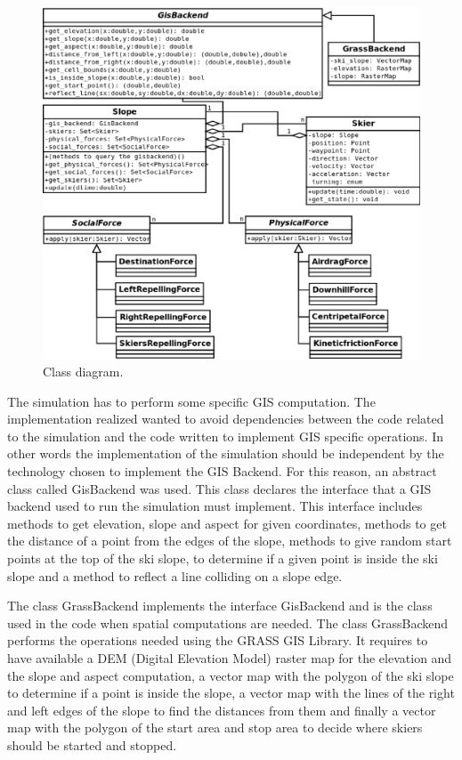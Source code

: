 \documentclass[12pt,a4paper,twoside]{book}
\begin{document}
\begin{figure}
  \begin{center}
    \includegraphics[width=\textwidth]{images/Class_diagram.eps}
    \caption{Class diagram.}\label{class_diagram}
  \end{center}
\end{figure}

The simulation has to perform some specific GIS computation. The implementation realized wanted to avoid dependencies between the code related to the simulation and the code written to implement GIS specific operations. In other words the implementation of the simulation should be independent by the technology chosen to implement the GIS Backend. For this reason, an abstract class called GisBackend was used. This class declares the interface that a GIS backend used to run the simulation must implement. This interface includes methods to get elevation, slope and aspect for given coordinates, methods to get the distance of a point from the edges of the slope, methods to give random start points at the top of the ski slope, to determine if a given point is inside the ski slope and a method to reflect a line colliding on a slope edge.

The class GrassBackend implements the interface GisBackend and is the class used in the code when spatial computations are needed. The class GrassBackend performs the operations needed using the GRASS GIS Library. It requires to have available a DEM (Digital Elevation Model) raster map for the elevation and the slope and aspect computation, a vector map with the polygon of the ski slope to determine if a point is inside the slope, a vector map with the lines of the right and left edges of the slope to find the distances from them and finally a vector map with the polygon of the start area and stop area to decide where skiers should be started and stopped.
\end{document}
